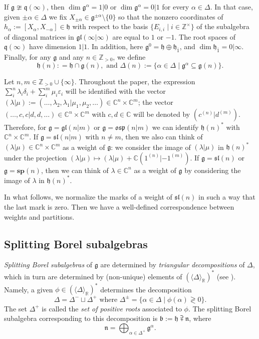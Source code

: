 \documentclass[12pt]{amsart}
\newcommand\C{\mathbb{C}}
\newcommand\Z{\mathbb{Z}}
\newcommand\R{\mathbb{R}}
\newcommand\g{\mathfrak{g}}
\newcommand\fq{\mathfrak{q}}
\newcommand\fh{\mathfrak{h}}
\newcommand\fn{\mathfrak{n}}
\newcommand\fb{\mathfrak{b}}
\newcommand\fsl{\mathfrak{sl}}
\newcommand\fosp{\mathfrak{osp}}
\newcommand\fgl{\mathfrak{gl}}
\newcommand\D{\Delta}
\newcommand\bsp{\mathbf{sp}}
\theoremstyle{plain}
\theoremstyle{definition}
\numberwithin{equation}{section}
\begin{document}
If $\g\ncong \fq(\infty)$, then $\dim \g^\alpha = 1|0$ or $\dim \g^\alpha = 0|1$ for every $\alpha\in \D$. In that case, given $\pm \alpha\in \D$ we fix $X_{\pm \alpha}\in \g^{\pm \alpha}\setminus\{0\}$ so that the nonzero coordinates of $h_\alpha:=[X_\alpha, X_{-\alpha}]\in \fh$ with respect to the basis $\{E_{i,i}\mid i\in \Z^\times\}$ of the subalgebra of diagonal matrices in $\fgl(\infty|\infty)$ are equal to $1$ or $-1$. The root spaces of $\fq(\infty)$ have dimension $1|1$. In addition, here $\g^0 = \fh\oplus \fh_{\bar 1}$, and $\dim \fh_{\bar 1} = 0|\infty$. Finally, for any $\g$ and any $n\in \Z_{>0}$, we define 
	\[
\fh(n): = \fh\cap \g(n), \text{ and } \D(n):=\{\alpha\in \D\mid \g^\alpha\subseteq \g(n)\}.
	\]
	
Let $n,m\in \Z_{>0}\cup \{\infty\}$. Throughout the paper, the expression $\sum_i^n \lambda_i\delta_i + \sum_i^m \mu_i\varepsilon_i$ will be identified with the vector $(\lambda|\mu):=(\ldots, \lambda_2, \lambda_1 | \mu_1,\mu_2,\ldots)\in \C^n\times\C^m$; the vector $(\ldots, c, c | d,d,\ldots)\in \C^n\times\C^m$ with $c,d\in \C$ will be denoted by $(c^{(n)} | d^{(m)})$. Therefore, for $\g=\fgl(n|m)$ or $\g = \fosp(n|m)$ we can identify $\fh(n)^*$ with $\C^n\times \C^m$. If $\g=\fsl(n|m)$ with $n\neq m$, then we also can think of $(\lambda | \mu)\in \C^n\times\C^m$ as a weight of $\g$: we consider the image of $(\lambda | \mu)$ in $\fh(n)^*$ under the projection $(\lambda | \mu) \mapsto (\lambda | \mu) + \C (1^{(n)}|-1^{(m)})$. If $\g =\fsl(n)$ or $\g= \bsp(n)$, then we can think of $\lambda\in \C^n$ as a weight of $\g$ by considering the image of $\lambda$ in $\fh(n)^*$.

In what follows, we normalize the marks of a weight of $\fsl(n)$ in such a way that the last mark is zero. Then we have a well-defined correspondence between weights and partitions.

\subsection{Splitting Borel subalgebras} \emph{Splitting Borel subalgebras} of $\g$ are determined by \emph{triangular decompositions} of $\D$, which in turn are determined  by (non-unique) elements of $(\langle\D\rangle_{\R})^*$ (see \cite[Proposition~2]{DP98}). Namely, a given $\phi\in (\langle\D\rangle_{\R})^*$ determines the decomposition
	\[
\D = \D^-\sqcup \D^+ \text{ where } \D^\pm = \{\alpha\in \D\mid \phi(\alpha)\gtrless 0\}.
	\]	
The set $\D^+$ is called the \emph{set of positive roots} associated to $\phi$. The splitting Borel subalgebra corresponding to this decomposition is $\fb:=\fh\supsetplus \fn$, where
	\[
\fn = \bigoplus_{\alpha\in \D^+} \g^\alpha.
	\]
\end{document}
